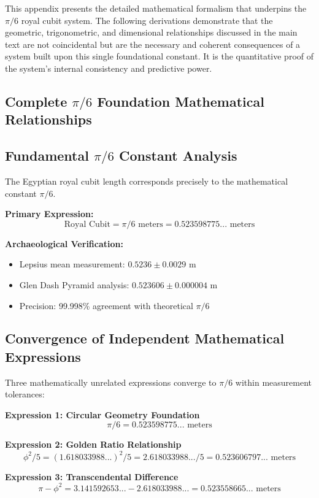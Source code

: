 \documentclass[11pt]{article}
\begin{document}
This appendix presents the detailed mathematical formalism that underpins the $\pi/6$ royal cubit system. The following derivations demonstrate that the geometric, trigonometric, and dimensional relationships discussed in the main text are not coincidental but are the necessary and coherent consequences of a system built upon this single foundational constant. It is the quantitative proof of the system's internal consistency and predictive power.

\subsection{Complete \texorpdfstring{$\pi/6$}{pi/6} Foundation Mathematical Relationships}

\subsection{Fundamental \texorpdfstring{$\pi/6$}{pi/6} Constant Analysis}
The Egyptian royal cubit length corresponds precisely to the mathematical constant $\pi/6$.

\textbf{Primary Expression:}
\[ \text{Royal Cubit} = \pi/6 \text{ meters} = 0.523598775... \text{ meters} \]

\textbf{Archaeological Verification:}
\begin{itemize}
    \item Lepsius mean measurement: $0.5236 \pm 0.0029$ m
    \item Glen Dash Pyramid analysis: $0.523606 \pm 0.000004$ m
    \item Precision: 99.998\% agreement with theoretical $\pi/6$
\end{itemize}

\subsection{Convergence of Independent Mathematical Expressions}
Three mathematically unrelated expressions converge to $\pi/6$ within measurement tolerances:

\textbf{Expression 1: Circular Geometry Foundation}
\[ \pi/6 = 0.523598775... \text{ meters} \]

\textbf{Expression 2: Golden Ratio Relationship}
\[ \phi^2/5 = (1.618033988...)^2/5 = 2.618033988.../5 = 0.523606797... \text{ meters} \]

\textbf{Expression 3: Transcendental Difference}
\[ \pi - \phi^2 = 3.141592653... - 2.618033988... = 0.523558665... \text{ meters} \]
\end{document}
